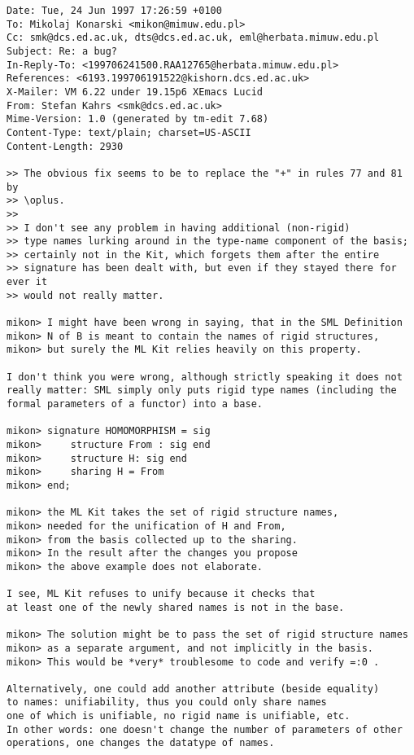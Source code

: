 \documentclass[12pt,a4paper]{article}
\begin{document}
{\small\begin{verbatim}
Date: Tue, 24 Jun 1997 17:26:59 +0100
To: Mikolaj Konarski <mikon@mimuw.edu.pl>
Cc: smk@dcs.ed.ac.uk, dts@dcs.ed.ac.uk, eml@herbata.mimuw.edu.pl
Subject: Re: a bug?
In-Reply-To: <199706241500.RAA12765@herbata.mimuw.edu.pl>
References: <6193.199706191522@kishorn.dcs.ed.ac.uk>
X-Mailer: VM 6.22 under 19.15p6 XEmacs Lucid
From: Stefan Kahrs <smk@dcs.ed.ac.uk>
Mime-Version: 1.0 (generated by tm-edit 7.68)
Content-Type: text/plain; charset=US-ASCII
Content-Length: 2930

>> The obvious fix seems to be to replace the "+" in rules 77 and 81 by
>> \oplus.
>> 
>> I don't see any problem in having additional (non-rigid)
>> type names lurking around in the type-name component of the basis;
>> certainly not in the Kit, which forgets them after the entire
>> signature has been dealt with, but even if they stayed there for ever it
>> would not really matter.

mikon> I might have been wrong in saying, that in the SML Definition
mikon> N of B is meant to contain the names of rigid structures,
mikon> but surely the ML Kit relies heavily on this property.

I don't think you were wrong, although strictly speaking it does not
really matter: SML simply only puts rigid type names (including the
formal parameters of a functor) into a base.

mikon> signature HOMOMORPHISM = sig
mikon>     structure From : sig end
mikon>     structure H: sig end
mikon>     sharing H = From 
mikon> end;

mikon> the ML Kit takes the set of rigid structure names,
mikon> needed for the unification of H and From,
mikon> from the basis collected up to the sharing.
mikon> In the result after the changes you propose
mikon> the above example does not elaborate.

I see, ML Kit refuses to unify because it checks that
at least one of the newly shared names is not in the base.

mikon> The solution might be to pass the set of rigid structure names
mikon> as a separate argument, and not implicitly in the basis.
mikon> This would be *very* troublesome to code and verify =:0 .

Alternatively, one could add another attribute (beside equality)
to names: unifiability, thus you could only share names
one of which is unifiable, no rigid name is unifiable, etc.
In other words: one doesn't change the number of parameters of other
operations, one changes the datatype of names.


\end{verbatim}}
\end{document}
